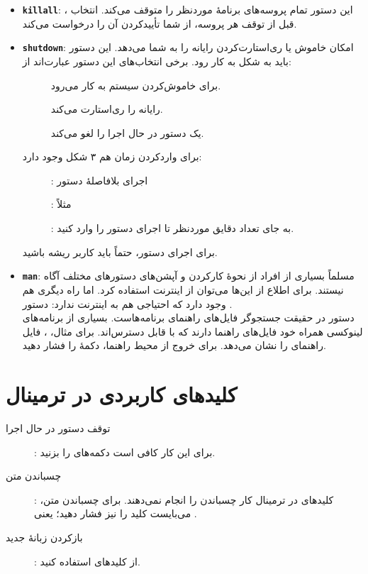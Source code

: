 \begin{itemize}
\item \textbf{\texttt{\Large killall}}: این دستور تمام پروسه‌های برنامهٔ موردنظر را متوقف می‌کند. انتخاب ، قبل از توقف هر پروسه، از شما تأییدکردن آن را درخواست می‌کند.

\item \textbf{\texttt{\Large shutdown}}: امکان خاموش یا ری‌استارت‌کردن رایانه را به شما می‌دهد. این دستور باید به شکل  به کار رود. برخی انتخاب‌های این دستور عبارت‌اند از:
\begin{description}
\item[] برای خاموش‌کردن سیستم به کار می‌رود.

\item[] رایانه را ری‌استارت می‌کند.

\item[] یک دستور  در حال اجرا را لغو می‌کند.
\end{description}
برای واردکردن زمان هم ۳ شکل وجود دارد:
\begin{description}
\item[]: اجرای بلافاصلهٔ دستور

\item[]: مثلاً 

\item[]: به جای  تعداد دقایق موردنظر تا اجرای دستور را وارد کنید.
\end{description}
برای اجرای دستور، حتماً باید کاربر ریشه باشید.

\item \textbf{\texttt{\Large man}}: مسلماً بسیاری از افراد از نحوهٔ کارکردن و آپشن‌های دستورهای مختلف آگاه نیستند. برای اطلاع از این‌ها می‌توان از اینترنت استفاده کرد. اما راه دیگری هم وجود دارد که احتیاجی هم به اینترنت ندارد: دستور .\\
دستور  در حقیقت جستجوگر فایل‌های راهنمای برنامه‌هاست. بسیاری از برنامه‌های لینوکسی همراه خود فایل‌های راهنما دارند که با  قابل دسترس‌اند. برای مثال، ، فایل راهنمای  را نشان می‌دهد. برای خروج از محیط راهنما، دکمهٔ  را فشار دهید.
\end{itemize}

\section{کلیدهای کاربردی در ترمینال}
\begin{description}
\item[توقف دستور در حال اجرا]: برای این کار کافی است دکمه‌های  را بزنید.

\item[چسباندن متن]: کلیدهای  در ترمینال کار چسباندن را انجام نمی‌دهند. برای چسباندن متن، می‌بایست کلید  را نیز فشار دهید؛ یعنی .

\item[بازکردن زبانهٔ جدید]: از کلیدهای  استفاده کنید.
\end{description}
